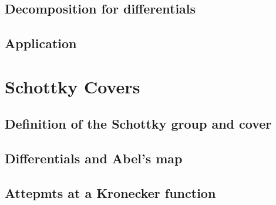 \subsection{Decomposition for differentials}

\subsection{Application}

\section{Schottky Covers}\label{secB12:Schottky}

\subsection{Definition of the Schottky group and cover}
\cite{Cha22}
\cite{ComputationalSchottky}

\subsection{Differentials and Abel's map}\label{secB12:SchottkyDifAndAbel}
\cite{Cha22}
\cite{ComputationalSchottky}

\subsection{Attepmts at a Kronecker function}
\cite{Cha22}



